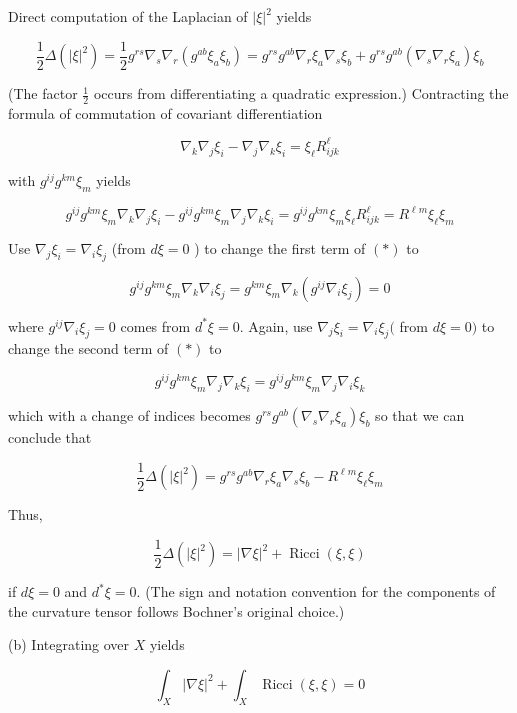 \documentclass[10pt]{article}
\begin{document}
Direct computation of the Laplacian of $|\xi|^{2}$ yields

$$
\frac{1}{2} \Delta\left(|\xi|^{2}\right)=\frac{1}{2} g^{r s} \nabla_{s} \nabla_{r}\left(g^{a b} \xi_{a} \xi_{b}\right)=g^{r s} g^{a b} \nabla_{r} \xi_{a} \nabla_{s} \xi_{b}+g^{r s} g^{a b}\left(\nabla_{s} \nabla_{r} \xi_{a}\right) \xi_{b}
$$

(The factor $\frac{1}{2}$ occurs from differentiating a quadratic expression.) Contracting the formula of commutation of covariant differentiation

$$
\nabla_{k} \nabla_{j} \xi_{i}-\nabla_{j} \nabla_{k} \xi_{i}=\xi_{\ell} R_{i j k}^{\ell}
$$

with $g^{i j} g^{k m} \xi_{m}$ yields

$$
g^{i j} g^{k m} \xi_{m} \nabla_{k} \nabla_{j} \xi_{i}-g^{i j} g^{k m} \xi_{m} \nabla_{j} \nabla_{k} \xi_{i}=g^{i j} g^{k m} \xi_{m} \xi_{\ell} R_{i j k}^{\ell}=R^{\ell m} \xi_{\ell} \xi_{m}
$$

Use $\nabla_{j} \xi_{i}=\nabla_{i} \xi_{j}$ (from $d \xi=0$ ) to change the first term of $(*)$ to

$$
g^{i j} g^{k m} \xi_{m} \nabla_{k} \nabla_{i} \xi_{j}=g^{k m} \xi_{m} \nabla_{k}\left(g^{i j} \nabla_{i} \xi_{j}\right)=0
$$

where $g^{i j} \nabla_{i} \xi_{j}=0$ comes from $d^{*} \xi=0$. Again, use $\nabla_{j} \xi_{i}=\nabla_{i} \xi_{j}($ from $d \xi=0)$ to change the second term of $(*)$ to

$$
g^{i j} g^{k m} \xi_{m} \nabla_{j} \nabla_{k} \xi_{i}=g^{i j} g^{k m} \xi_{m} \nabla_{j} \nabla_{i} \xi_{k}
$$

which with a change of indices becomes $g^{r s} g^{a b}\left(\nabla_{s} \nabla_{r} \xi_{a}\right) \xi_{b}$ so that we can conclude that

$$
\frac{1}{2} \Delta\left(|\xi|^{2}\right)=g^{r s} g^{a b} \nabla_{r} \xi_{a} \nabla_{s} \xi_{b}-R^{\ell m} \xi_{\ell} \xi_{m}
$$

Thus,

$$
\frac{1}{2} \Delta\left(|\xi|^{2}\right)=|\nabla \xi|^{2}+\operatorname{Ricci}(\xi, \xi)
$$

if $d \xi=0$ and $d^{*} \xi=0$. (The sign and notation convention for the components of the curvature tensor follows Bochner's original choice.)

(b) Integrating over $X$ yields

$$
\int_{X}|\nabla \xi|^{2}+\int_{X} \operatorname{Ricci}(\xi, \xi)=0
$$
\end{document}
